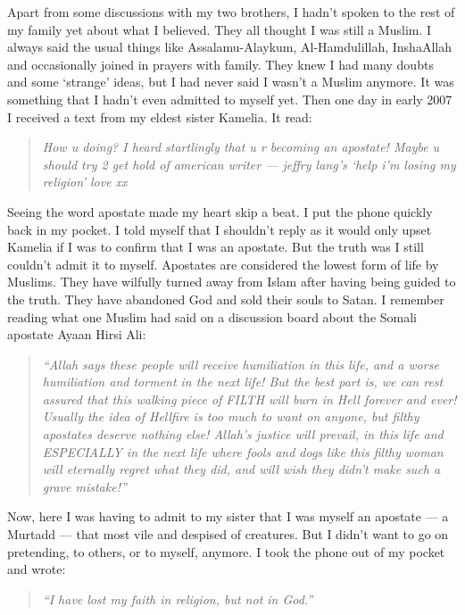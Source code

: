 \documentclass[12pt]{memoir}
\begin{document}
Apart from some discussions with my two brothers,
I hadn’t spoken to the rest of my family yet about what I believed.
They all thought I was still a Muslim.
I always said the usual things like Assalamu-Alaykum, Al-Hamdulillah,
Insha\´Allah and occasionally joined in prayers with family.
They knew I had many doubts and some ‘strange’ ideas,
but I had never said I wasn’t a Muslim anymore.
It was something that I hadn’t even admitted to myself yet.
Then one day in early 2007 I received a text from my eldest sister Kamelia.
It read:

\begin{quote}
\itshape
How u doing?
I heard startlingly that u r becoming an apostate!
Maybe u should try 2 get hold of american writer —
jeffry lang’s ‘help i’m losing my religion’ love xx
\end{quote}

Seeing the word apostate made my heart skip a beat.
I put the phone quickly back in my pocket.
I told myself that I shouldn’t reply as it would only upset Kamelia
if I was to confirm that I was an apostate.
But the truth was I still couldn’t admit it to myself.
Apostates are considered the lowest form of life by Muslims.
They have wilfully turned away from Islam
after having being guided to the truth.
They have abandoned God and sold their souls to Satan.
I remember reading what one Muslim had said on a discussion board
about the Somali apostate Ayaan Hirsi Ali:

\begin{quote}
\itshape
“Allah says these people will receive humiliation in this life,
and a worse humiliation and torment in the next life!
But the best part is, we can rest assured
that this walking piece of FILTH will burn in Hell forever and ever!
Usually the idea of Hellfire is too much to want on anyone,
but filthy apostates deserve nothing else! Allah’s justice will prevail,
in this life and ESPECIALLY in the next life where fools and dogs
like this filthy woman will eternally regret what they did,
and will wish they didn’t make such a grave mistake!”
\end{quote}

Now, here I was having to admit to my sister that I was myself an apostate —
a Murtadd — that most vile and despised of creatures.
But I didn’t want to go on pretending, to others, or to myself, anymore.
I took the phone out of my pocket and wrote:

\begin{quote}
\emph{“I have lost my faith in religion, but not in God.”}
\end{quote}
\end{document}
